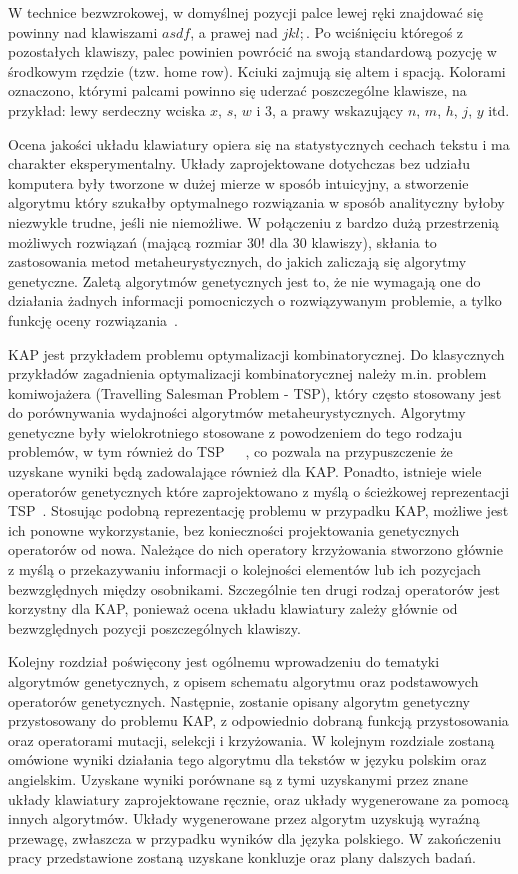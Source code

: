 \documentclass{xmgr}
\begin{document}
W technice bezwzrokowej, w domyślnej pozycji palce lewej ręki znajdować się powinny nad klawiszami $asdf$, a prawej nad $jkl;$. Po wciśnięciu któregoś z pozostałych klawiszy, palec powinien powrócić na swoją standardową pozycję w środkowym rzędzie (tzw. home row). Kciuki zajmują się altem i spacją. Kolorami oznaczono, którymi palcami powinno się uderzać poszczególne klawisze, na przykład: lewy serdeczny wciska $x$, $s$, $w$ i $3$, a prawy wskazujący $n$, $m$, $h$, $j$, $y$ itd.

Ocena jakości układu klawiatury opiera się na statystycznych cechach tekstu i ma charakter eksperymentalny. Układy zaprojektowane dotychczas bez udziału komputera były tworzone w dużej mierze w sposób intuicyjny, a stworzenie algorytmu który szukałby optymalnego rozwiązania w sposób analityczny byłoby niezwykle trudne, jeśli nie niemożliwe. W połączeniu z bardzo dużą przestrzenią możliwych rozwiązań (mającą rozmiar $30!$ dla 30 klawiszy), skłania to zastosowania metod metaheurystycznych, do jakich zaliczają się algorytmy genetyczne. Zaletą algorytmów genetycznych jest to, że nie wymagają one do działania żadnych informacji pomocniczych o rozwiązywanym problemie, a tylko funkcję oceny rozwiązania~\cite{Goldberg:1998:AGZ}.

KAP jest przykładem problemu optymalizacji kombinatorycznej. Do klasycznych przykładów zagadnienia optymalizacji kombinatorycznej należy m.in. problem komiwojażera (Travelling Salesman Problem - TSP), który często stosowany jest do porównywania wydajności algorytmów metaheurystycznych. Algorytmy genetyczne były wielokrotniego stosowane z powodzeniem do tego rodzaju problemów, w tym również do TSP~\cite{Michalewicz:2003:AGSDPE}~\cite{Brady}~\cite{Stutzle:2000:CNI:645825.668943}, co pozwala na przypuszczenie że uzyskane wyniki będą zadowalające również dla KAP. Ponadto, istnieje wiele operatorów genetycznych które zaprojektowano z myślą o ścieżkowej reprezentacji TSP~\cite{Larranaga99geneticalgorithms}. Stosując podobną reprezentację problemu w przypadku KAP, możliwe jest ich ponowne wykorzystanie, bez konieczności projektowania genetycznych operatorów od nowa. Należące do nich operatory krzyżowania stworzono głównie z myślą o przekazywaniu informacji o kolejności elementów lub ich pozycjach bezwzględnych między osobnikami. Szczególnie ten drugi rodzaj operatorów jest korzystny dla KAP, ponieważ ocena układu klawiatury zależy głównie od bezwzględnych pozycji poszczególnych klawiszy.

Kolejny rozdział poświęcony jest ogólnemu wprowadzeniu do tematyki algorytmów genetycznych, z opisem schematu algorytmu oraz podstawowych operatorów genetycznych. Następnie, zostanie opisany algorytm genetyczny przystosowany do problemu KAP, z odpowiednio dobraną funkcją przystosowania oraz operatorami mutacji, selekcji i krzyżowania. W kolejnym rozdziale zostaną omówione wyniki działania tego algorytmu dla tekstów w języku polskim oraz angielskim. Uzyskane wyniki porównane są z tymi uzyskanymi przez znane układy klawiatury zaprojektowane ręcznie, oraz układy wygenerowane za pomocą innych algorytmów. Układy wygenerowane przez algorytm uzyskują wyraźną przewagę, zwłaszcza w przypadku wyników dla języka polskiego. W zakończeniu pracy przedstawione zostaną uzyskane konkluzje oraz plany dalszych badań.
\end{document}
